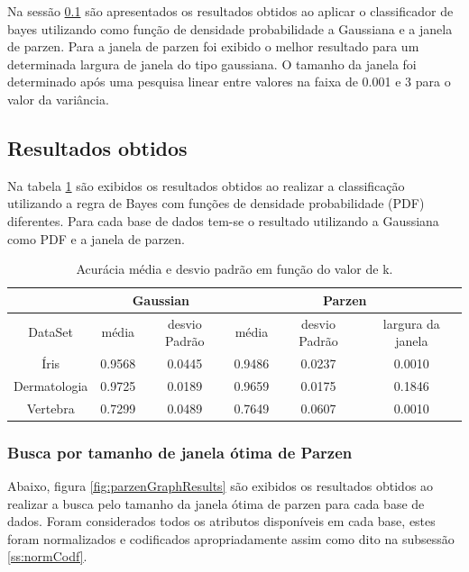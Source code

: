 \documentclass[ 
	article,			%
	11pt,				%
	oneside,			%
	a4paper,			%
	english,			%
	brazil,				%
	]{abntex2}
\begin{document}
Na sessão \ref{ss:resultadosObtidos} são apresentados os resultados obtidos ao
aplicar o classificador de bayes utilizando como função de densidade probabilidade a Gaussiana e a
janela de parzen. Para a janela de parzen foi exibido o melhor resultado para um
determinada largura de janela do tipo gaussiana. O tamanho da janela foi
determinado após uma pesquisa linear entre valores na faixa de 0.001 e 3 para o
valor da variância.
 
\subsection{Resultados obtidos}
\label{ss:resultadosObtidos}

Na tabela \ref{tab:acuracia} são exibidos os resultados obtidos ao realizar a
classificação utilizando a regra de Bayes com funções de densidade probabilidade
(PDF) diferentes. Para cada base de dados tem-se o resultado utilizando a
Gaussiana como PDF e a janela de parzen.

\begin{table}
	\centering
    \begin{tabular}{c|c|c|c|c|c}%

             & \multicolumn{2}{c|}{Gaussian}  & \multicolumn{3}{c}{Parzen} \\

          \hline DataSet & média & desvio Padrão & média & desvio Padrão & largura da janela \\ 
          
          \hline Íris         & 0.9568 & 0.0445 & 0.9486 & 0.0237 & 0.0010 \\
          
          \hline Dermatologia & 0.9725 & 0.0189 & 0.9659 & 0.0175 & 0.1846 \\
          \hline Vertebra     & 0.7299 & 0.0489 & 0.7649 & 0.0607 & 0.0010 \\
          \hline

    \end{tabular}
    \caption{Acurácia média e desvio padrão em função do valor de k.}
    \label{tab:acuracia}
\end{table}

\subsubsection{Busca por tamanho de janela ótima de Parzen}
\label{sss:OptSizWindSearc}

Abaixo, figura \ref{fig:parzenGraphResults} são exibidos os resultados obtidos
ao realizar a busca pelo tamanho da janela ótima de parzen para cada base de dados.
Foram considerados todos os atributos disponíveis em cada base, estes
foram normalizados e codificados apropriadamente assim como dito na
subsessão \ref{ss:normCodf}.
\end{document}
